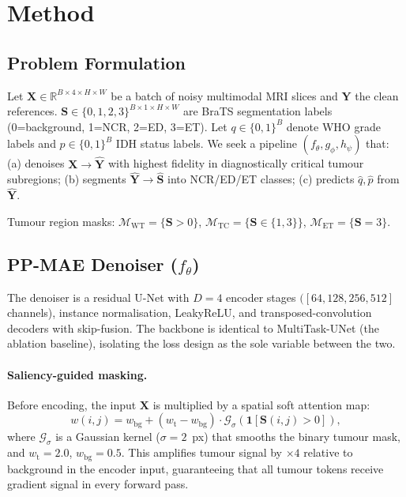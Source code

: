 \documentclass[runningheads]{llncs}
\newcommand{\ET}{\text{ET}}
\newcommand{\TC}{\text{TC}}
\newcommand{\WT}{\text{WT}}
\begin{document}
\section{Method}
\label{sec:method}

\subsection{Problem Formulation}

Let $\bm{X} \in \mathbb{R}^{B \times 4 \times H \times W}$ be a batch
of noisy multimodal MRI slices and $\bm{Y}$ the clean references.
$\bm{S} \in \{0,1,2,3\}^{B\times 1\times H\times W}$ are BraTS
segmentation labels (0=background, 1=NCR, 2=ED, 3=ET).
Let $q \in \{0,1\}^B$ denote WHO grade labels and
$p \in \{0,1\}^B$ IDH status labels.
We seek a pipeline $(f_\theta, g_\phi, h_\psi)$ that:
(a) denoises $\bm{X} \to \hat{\bm{Y}}$ with highest fidelity in
diagnostically critical tumour subregions;
(b) segments $\hat{\bm{Y}} \to \hat{\bm{S}}$ into NCR/ED/ET classes;
(c) predicts $\hat{q}, \hat{p}$ from $\hat{\bm{Y}}$.

Tumour region masks: $\mathcal{M}_\WT = \{\bm{S}>0\}$,
$\mathcal{M}_\TC = \{\bm{S}\in\{1,3\}\}$,
$\mathcal{M}_\ET = \{\bm{S}=3\}$.

\subsection{PP-MAE Denoiser ($f_\theta$)}
\label{subsec:denoiser}

The denoiser is a residual U-Net with $D{=}4$ encoder stages
$([\!64,\!128,\!256,\!512\!]$ channels), instance normalisation,
LeakyReLU, and transposed-convolution decoders with skip-fusion.
The backbone is identical to MultiTask-UNet (the ablation baseline),
isolating the loss design as the sole variable between the two.

\paragraph{Saliency-guided masking.}
Before encoding, the input $\bm{X}$ is multiplied by a spatial
soft attention map:
\begin{equation}
w(i,j) = w_\text{bg} + (w_\text{t} - w_\text{bg})\cdot
  \mathcal{G}_\sigma\!\left(\mathbf{1}[\bm{S}(i,j)>0]\right),
\label{eq:saliency}
\end{equation}
where $\mathcal{G}_\sigma$ is a Gaussian kernel ($\sigma{=}2$~px)
that smooths the binary tumour mask, and $w_\text{t}{=}2.0$,
$w_\text{bg}{=}0.5$.
This amplifies tumour signal by ${\times}4$ relative to background
in the encoder input, guaranteeing that all tumour tokens receive
gradient signal in every forward pass.
\end{document}
